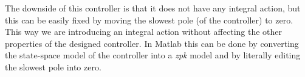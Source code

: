   \begin{figure}[h]
  \centering
  \hfill
  \caption{}
\end{figure}

The downside of this controller is that it does not have any integral action, but this can be easily fixed by moving the slowest pole (of the controller) to zero. This way we are introducing an integral action without affecting the other properties of the designed controller. In Matlab this can be done by converting the state-space model of the controller into a \emph{zpk} model and by literally editing the slowest pole into zero.\\


